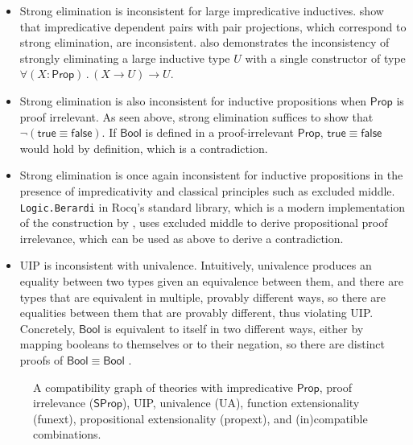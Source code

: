 \documentclass{article}
\newcommand{\kw}[1]{\mathsf{#1}}
\newcommand{\code}[1]{\texttt{#1}}
\begin{document}
\begin{itemize}[noitemsep,topsep=0pt]
  \item Strong elimination is inconsistent for large impredicative inductives.
    \citet{strong-pair} show that impredicative dependent pairs with pair projections,
    which correspond to strong elimination, are inconsistent.
    \citet{trees} also demonstrates the inconsistency of strongly eliminating
    a large inductive type $U$ with a single constructor of type
    $\forall (X : \kw{Prop})\mathpunct{.} (X \to U) \to U$.
  \item Strong elimination is also inconsistent for inductive propositions
    when $\kw{Prop}$ is proof irrelevant.
    As seen above, strong elimination suffices to show that $\neg (\kw{true} \equiv \kw{false})$.
    If $\kw{Bool}$ is defined in a proof-irrelevant $\kw{Prop}$,
    $\kw{true} \equiv \kw{false}$ would hold by definition,
    which is a contradiction.
  \item Strong elimination is once again inconsistent for inductive propositions
    in the presence of impredicativity and classical principles such as excluded middle.
    \code{Logic.Berardi} in Rocq's standard library,
    which is a modern implementation of the construction by \cite{em-irr},
    uses excluded middle to derive propositional proof irrelevance,
    which can be used as above to derive a contradiction.
  \item UIP is inconsistent with univalence.
    Intuitively, univalence produces an equality between two types
    given an equivalence between them,
    and there are types that are equivalent in multiple, provably different ways,
    so there are equalities between them that are provably different,
    thus violating UIP.
    Concretely, $\kw{Bool}$ is equivalent to itself in two different ways,
    either by mapping booleans to themselves or to their negation,
    so there are distinct proofs of $\kw{Bool} \equiv \kw{Bool}$
    \citep[Example 3.1.9]{hott}.
\end{itemize}

\begin{figure}[ht]
\centering
{}
\caption{A compatibility graph of theories with impredicative $\kw{Prop}$, proof irrelevance ($\kw{SProp}$),
  UIP, univalence (UA), function extensionality (funext), propositional extensionality (propext),
  and (in)compatible combinations.}
\label{fig:lattice}
\end{figure}
\end{document}

